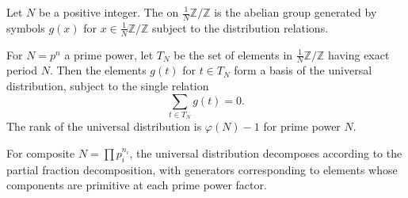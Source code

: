 Let $N$ be a positive integer. The  on $\frac{1}{N}\mathbb{Z}/\mathbb{Z}$ is the abelian group generated by symbols $g(x)$ for $x \in \frac{1}{N}\mathbb{Z}/\mathbb{Z}$ subject to the distribution relations. 

For $N = p^n$ a prime power, let $T_N$ be the set of elements in $\frac{1}{N}\mathbb{Z}/\mathbb{Z}$ having exact period $N$. Then the elements $g(t)$ for $t \in T_N$ form a basis of the universal distribution, subject to the single relation
$$
\sum_{t \in T_N} g(t) = 0.
$$
The rank of the universal distribution is $\varphi(N) - 1$ for prime power $N$.

For composite $N = \prod p_i^{n_i}$, the universal distribution decomposes according to the partial fraction decomposition, with generators corresponding to elements whose components are primitive at each prime power factor.
